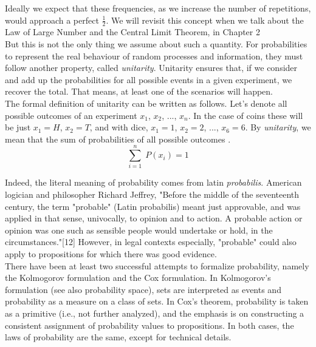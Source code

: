 \documentclass{book}
\begin{document}
Ideally we expect that these frequencies, as we increase the number of repetitions, would approach a perfect $\frac{1}{2}$. We will revisit this concept when we talk about the Law of Large Number and the Central Limit Theorem, in Chapter 2\\

But this is not the only thing we assume about such a quantity. For probabilities to represent the real behaviour of random processes and information, they must follow another property, called \textit{unitarity}. Unitarity ensures that, if we consider and add up the probabilities for all possible events in a given experiment, we recover the total. That means, at least one of the scenarios will happen.\\

The formal definition of unitarity can be written as follows. Let's denote all possible outcomes of an experiment $x_{1}$, $x_{2}$, ..., $x_{n}$. In the case of coins these will be just $x_{1} = H$, $x_{2} = T$, and with dice, $x_{1} = 1$, $x_{2} = 2$, ..., $x_{6} = 6$. By \textit{unitarity}, we mean that the sum of probabilities of all possible outcomes . \begin{equation}
	\sum_{i = 1}^{n} \; P(x_{i}) = 1
\end{equation}

Indeed, the literal meaning of probability comes from latin \textit{probabilis}. American logician and philosopher Richard Jeffrey, "Before the middle of the seventeenth century, the term "probable" (Latin probabilis) meant just approvable, and was applied in that sense, univocally, to opinion and to action. A probable action or opinion was one such as sensible people would undertake or hold, in the circumstances."[12] However, in legal contexts especially, "probable" could also apply to propositions for which there was good evidence.\\

There have been at least two successful attempts to formalize probability, namely the Kolmogorov formulation and the Cox formulation. In Kolmogorov's formulation (see also probability space), sets are interpreted as events and probability as a measure on a class of sets. In Cox's theorem, probability is taken as a primitive (i.e., not further analyzed), and the emphasis is on constructing a consistent assignment of probability values to propositions. In both cases, the laws of probability are the same, except for technical details.\\
\end{document}
